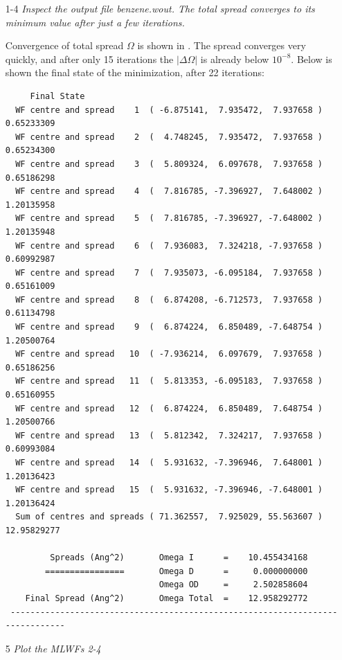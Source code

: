 \begin{itemize}
\item[1-4] {\it Inspect the output file benzene.wout. The total spread converges to its minimum value after just a
few iterations.}

Convergence of total spread $\Omega$ is shown in . The spread converges very quickly, and after only 15 iterations the $|\Delta\Omega|$ is already below $10^{-8}$.
Below is shown the final state of the minimization, after 22 iterations:
  \begin{tcolorbox}[sharp corners,boxrule=0.5pt]
  {\small
	\begin{verbatim}
	 Final State
  WF centre and spread    1  ( -6.875141,  7.935472,  7.937658 )     0.65233309
  WF centre and spread    2  (  4.748245,  7.935472,  7.937658 )     0.65234300
  WF centre and spread    3  (  5.809324,  6.097678,  7.937658 )     0.65186298
  WF centre and spread    4  (  7.816785, -7.396927,  7.648002 )     1.20135958
  WF centre and spread    5  (  7.816785, -7.396927, -7.648002 )     1.20135948
  WF centre and spread    6  (  7.936083,  7.324218, -7.937658 )     0.60992987
  WF centre and spread    7  (  7.935073, -6.095184,  7.937658 )     0.65161009
  WF centre and spread    8  (  6.874208, -6.712573,  7.937658 )     0.61134798
  WF centre and spread    9  (  6.874224,  6.850489, -7.648754 )     1.20500764
  WF centre and spread   10  ( -7.936214,  6.097679,  7.937658 )     0.65186256
  WF centre and spread   11  (  5.813353, -6.095183,  7.937658 )     0.65160955
  WF centre and spread   12  (  6.874224,  6.850489,  7.648754 )     1.20500766
  WF centre and spread   13  (  5.812342,  7.324217,  7.937658 )     0.60993084
  WF centre and spread   14  (  5.931632, -7.396946,  7.648001 )     1.20136423
  WF centre and spread   15  (  5.931632, -7.396946, -7.648001 )     1.20136424
  Sum of centres and spreads ( 71.362557,  7.925029, 55.563607 )    12.95829277

         Spreads (Ang^2)       Omega I      =    10.455434168
        ================       Omega D      =     0.000000000
                               Omega OD     =     2.502858604
    Final Spread (Ang^2)       Omega Total  =    12.958292772
 ------------------------------------------------------------------------------
	\end{verbatim}
	}
	\end{tcolorbox}

\item[5] {\it Plot the MLWFs 2-4}


\end{itemize}
